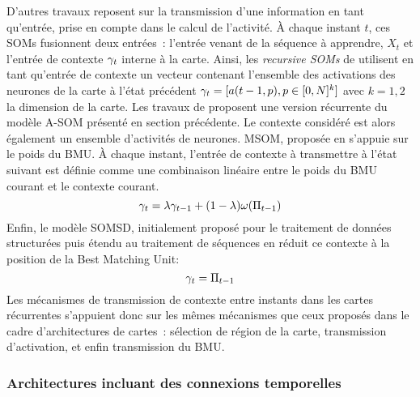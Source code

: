 \documentclass[../main]{subfiles}
\begin{document}
D'autres travaux reposent sur la transmission d'une information en tant qu'entrée, prise en compte dans le calcul de l'activité.
\`A chaque instant $t$, ces SOMs fusionnent deux entrées~: l'entrée venant de la séquence à apprendre, $X_t$ et l'entrée de contexte $\gamma_t$ interne à la carte.
Ainsi, les \emph{recursive SOMs} de \cite{Voegtlin2002RecursiveSM} utilisent en tant qu'entrée de contexte un vecteur contenant l'ensemble des activations des neurones de la carte à l'état précédent $\gamma_t = [a(t-1,p), p \in [0,N]^k]$ avec $k = 1, 2$ la dimension de la carte.
Les travaux de \cite{Buonamente2013SimulatingAW} proposent une version récurrente du modèle A-SOM présenté en section précédente. 
Le contexte considéré est alors également un ensemble d'activités de neurones. 
MSOM, proposée en \cite{Strickert2005MergeSF} s'appuie sur le poids du BMU. 
\`A chaque instant, l'entrée de contexte à transmettre à l'état suivant est définie comme une combinaison linéaire entre le poids du BMU courant et le contexte courant.
$$\gamma_t = \lambda \gamma_{t-1} + (1-\lambda)\omega(\Pi_{t-1}) $$
Enfin, le modèle SOMSD, initialement proposé pour le traitement de données structurées \parencite{hagenbuchner_self-organizing_2003} puis étendu au traitement de séquences en \cite{hammer_recursive_2004,hammer_self-organizing_2005} réduit ce contexte à la position de la Best Matching Unit:
$$ \gamma_{t} = \Pi_{t-1}$$
Les mécanismes de transmission de contexte entre instants dans les cartes récurrentes s'appuient donc sur les mêmes mécanismes que ceux proposés dans le cadre d'architectures de cartes~: sélection de région de la carte, transmission d'activation, et enfin transmission du BMU.

\subsubsection{Architectures incluant des connexions temporelles}
\end{document}
